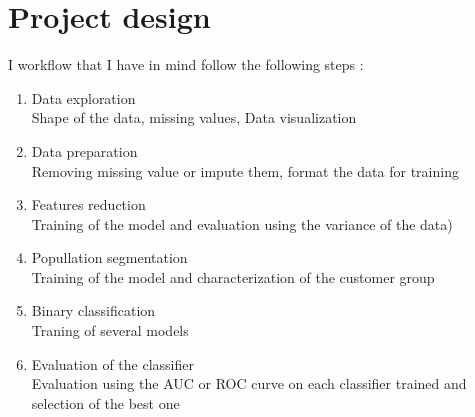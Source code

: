 \documentclass[12pt]{article}
\begin{document}
\section{Project design}

I workflow that I have in mind follow the following steps :
\begin{enumerate}
\item Data exploration\\
Shape of the data, missing values, Data visualization
\item Data preparation\\
Removing missing value or impute them, format the data for training
\item Features reduction\\
Training of the model and evaluation using the variance of the data)
\item Popullation segmentation\\
Training of the model and characterization of the customer group
\item Binary classification\\
Traning of several models
\item Evaluation of the classifier\\
Evaluation using the AUC or ROC curve on each classifier trained and selection of the best one
\end{enumerate}

 

\end{document}
